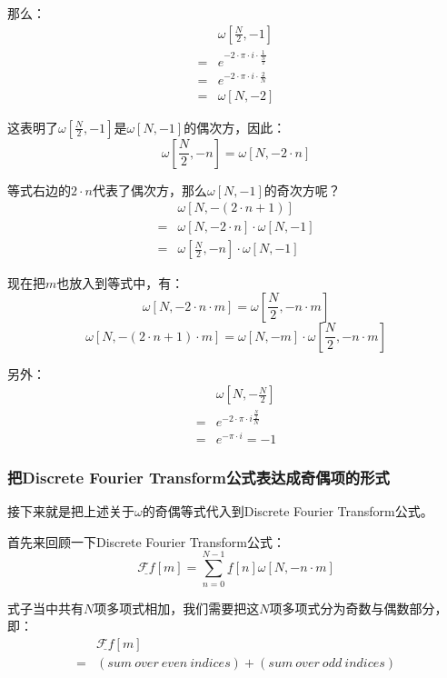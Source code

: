 那么：
\begin{align*}
	  & \omega[\frac{N}{2},-1]                             \\
	= & e^{-2\cdot \pi\cdot  i\cdot \frac{1}{\frac{N}{2}}} \\
	= & e^{-2\cdot \pi\cdot  i\cdot \frac{2}{N}}           \\
	= & \omega[N,-2]
\end{align*}

这表明了$\omega[\frac{N}{2},-1]$是$\omega[N,-1]$的偶次方，因此：
\begin{equation}
	\omega[\frac{N}{2},-n] = \omega[N,-2\cdot n]
\end{equation}

等式右边的$2\cdot n$代表了偶次方，那么$\omega[N,-1]$的奇次方呢？
\begin{align*}
	  & \omega[N,-(2\cdot n+1)]                  \\
	= & \omega[N,-2\cdot n]\cdot \omega[N,-1]    \\
	= & \omega[\frac{N}{2},-n]\cdot \omega[N,-1]
\end{align*}

现在把$m$也放入到等式中，有：
\begin{equation}
	\omega[N,-2\cdot n\cdot m]  = \omega[\frac{N}{2},-n\cdot m]
\end{equation}
\begin{equation}
	\omega[N,-(2\cdot n+1)\cdot m]  = \omega[N,-m]\cdot \omega[\frac{N}{2},-n\cdot m]
\end{equation}

另外：
\begin{align*}
	  & \omega[N,-\frac{N}{2}]                       \\
	= & e^{-2\cdot \pi\cdot  i\frac{\frac{N}{2}}{N}} \\
	= & e^{-\pi\cdot  i} = -1
\end{align*}
\subsubsection{把Discrete Fourier Transform公式表达成奇偶项的形式}
接下来就是把上述关于$\omega$的奇偶等式代入到Discrete Fourier Transform公式。

首先来回顾一下Discrete Fourier Transform公式：
$$
	\underline{\mathcal{F}f}[m] =  \sum_{n=0}^{N-1}\underline{f}[n]\omega[N,-n\cdot m]
$$

式子当中共有$N$项多项式相加，我们需要把这$N$项多项式分为奇数与偶数部分，即：
\begin{align*}
	  & \underline{\mathcal{F}f}[m]                          \\
	= & (sum\ over\ even\ indices)+(sum\ over\ odd\ indices)
\end{align*}

